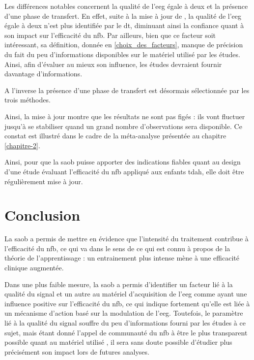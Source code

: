 Les différences notables concernent la qualité de l'\gls{eeg} égale à deux et la présence d'une phase de transfert. En effet, suite à la mise à jour de \citet{Bussalb2019clinical}, 
la qualité de l'\gls{eeg} égale à deux 
n'est plus identifiée par le \gls{dt}, diminuant ainsi la confiance quant à son impact sur l'efficacité du \gls{nfb}. Par ailleurs, bien que ce facteur soit intéressant, sa définition, 
donnée en \ref{choix_des_facteurs}, manque de précision 
du fait du peu d'informations disponibles sur le matériel utilisé par les études. Ainsi, afin d'évaluer au mieux son influence, les études devraient fournir 
davantage d'informations.

A l'inverse la présence d'une phase de transfert est désormais sélectionnée par les trois méthodes.

Ainsi, la mise à jour montre que les résultats ne sont pas figés : ils vont fluctuer jusqu'à se stabiliser quand un grand nombre d'observations sera disponible. Ce constat est illustré dans 
le cadre de la méta-analyse présentée au chapitre \ref{chapitre-2}.

Ainsi, pour que la \gls{saob} puisse apporter des indications fiables quant au design d'une étude évaluant l'efficacité du \gls{nfb} appliqué aux enfants \gls{tdah}, elle doit être 
régulièrement mise à jour. 

\section{Conclusion}

La \gls{saob} a permis de mettre en évidence que l'intensité du traitement contribue à l'efficacité du \gls{nfb}, ce qui va dans le sens de ce qui est connu à propos de 
la théorie de l'apprentissage \citep{Mowrer1960} : un entrainement plus intense mène à une efficacité clinique augmentée. 

Dans une plus faible mesure, la \gls{saob} a permis d'identifier un facteur lié à la qualité du signal et un autre au matériel d'acquisition de l'\gls{eeg} comme ayant une influence positive 
sur l'efficacité du \gls{nfb}, ce qui indique fortement qu'elle est liée à un mécanisme d'action basé sur la modulation de l'\gls{eeg}. Toutefois, le paramètre lié à la qualité du signal 
souffre du peu d'informations fourni par les études à ce sujet, mais étant donné l'appel de
communauté du \gls{nfb} à être le plus transparent possible quant au matériel utilisé \citep{Ros2019}, il sera sans doute possible d'étudier plus précisément
son impact lors de futures analyses.

